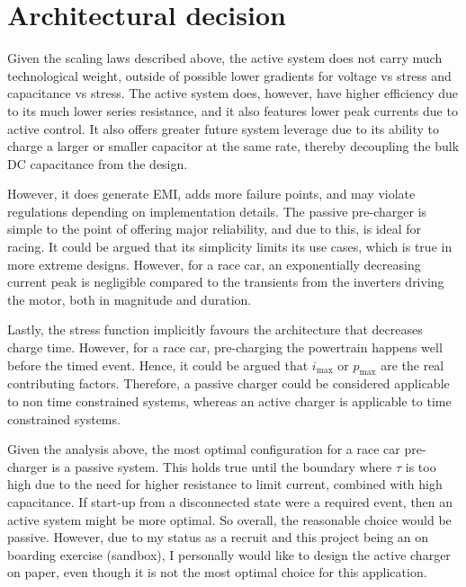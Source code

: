 \documentclass{article}
\begin{document}
\section{Architectural decision}

Given the scaling laws described above, the active system does not carry much technological weight, outside of possible lower gradients for voltage vs stress and capacitance vs stress. The active system does, 
however, have higher efficiency due to its much lower series resistance, and it also features lower peak currents due to active control. It also offers greater future system leverage due to its ability to charge a 
larger or smaller capacitor at the same rate, thereby decoupling the bulk DC capacitance from the design.

\vspace{0.5cm}
However, it does generate EMI, adds more failure points, and may violate regulations depending on implementation details. The passive pre-charger is simple to the point of offering major reliability, and due to this, 
is ideal for racing. It could be argued that its simplicity limits its use cases, which is true in more extreme designs. However, for a race car, an exponentially decreasing current peak is negligible compared to the 
transients from the inverters driving the motor, both in magnitude and duration. 

\vspace{0.5cm}
Lastly, the stress function implicitly favours the architecture that decreases charge time. However, for a race car, pre-charging the powertrain happens well before the timed event. Hence, it could be argued that 
$i_{\max}$ or $p_{\max}$ are the real contributing factors. Therefore, a passive charger could be considered applicable to non time constrained systems, whereas an active charger is applicable to time constrained systems. 

\vspace{0.5cm}
Given the analysis above, the most optimal configuration for a race car pre-charger is a passive system. This holds true until the boundary where $\tau$ is too high due to the need for higher resistance to limit current, 
combined with high capacitance. If start-up from a disconnected state were a required event, then an active system might be more optimal. So overall, the reasonable choice would be passive. However, due to my status as a 
recruit and this project being an on boarding exercise (sandbox), I personally would like to design the active charger on paper, even though it is not the most optimal choice for this application.
\end{document}
